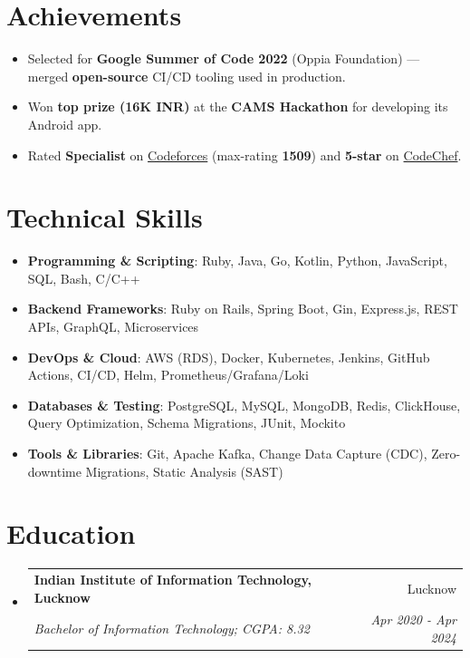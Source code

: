 \documentclass[letterpaper,10pt]{article}
\makeatletter
\newcommand{\resumeSubheading}[4]{
  \item
    \begin{tabular*}{0.97\textwidth}{l@{\extracolsep{\fill}}r}
      \textbf{#1} & #2 \\
      \textit{\small#3} & \textit{\small #4} \\
    \end{tabular*}
}
\newcommand{\resumeSubHeadingListStart}{\vspace{-3pt}\begin{itemize}[leftmargin=*,itemsep=4pt,parsep=0pt]}
\newcommand{\resumeSubHeadingListEnd}{\end{itemize}}
\makeatother
\begin{document}
\section{Achievements}
\begin{itemize}[leftmargin=*, itemsep=1pt, parsep=0pt]
      \selectfont\small
      \setlength\itemsep{0em}
      \setlength\parsep{0em}
      \item Selected for \textbf{Google Summer of Code 2022} (Oppia Foundation) --- merged \textbf{open-source} CI/CD tooling used in production.
      \item Won \textbf{top prize (16K INR)} at the \textbf{CAMS Hackathon} for developing its Android app.
      \item Rated \textbf{Specialist} on \href{https://codeforces.com/profile/segment_trACk}{Codeforces} (max-rating \textbf{1509}) and \textbf{5-star} on \href{https://www.codechef.com/users/up84}{CodeChef}.
\end{itemize}


\section{Technical Skills}
\begin{itemize}[leftmargin=*, itemsep=1pt, parsep=0pt]
      \selectfont\small
      \setlength\itemsep{0em}
      \setlength\parsep{0em}
      \item \textbf{Programming \& Scripting}: Ruby, Java, Go, Kotlin, Python, JavaScript, SQL, Bash, C/C++
      \item \textbf{Backend Frameworks}: Ruby on Rails, Spring Boot, Gin, Express.js, REST APIs, GraphQL, Microservices
      \item \textbf{DevOps \& Cloud}: AWS (RDS), Docker, Kubernetes, Jenkins, GitHub Actions, CI/CD, Helm, Prometheus/Grafana/Loki
      \item \textbf{Databases \& Testing}: PostgreSQL, MySQL, MongoDB, Redis, ClickHouse, Query Optimization, Schema Migrations, JUnit, Mockito
      \item \textbf{Tools \& Libraries}: Git, Apache Kafka, Change Data Capture (CDC), Zero-downtime Migrations, Static Analysis (SAST)
\end{itemize}

\section{Education}
\resumeSubHeadingListStart
\resumeSubheading
{Indian Institute of Information Technology, Lucknow}{Lucknow}
{Bachelor of Information Technology;  CGPA: 8.32}{Apr 2020 - Apr 2024}
\resumeSubHeadingListEnd
\end{document}
